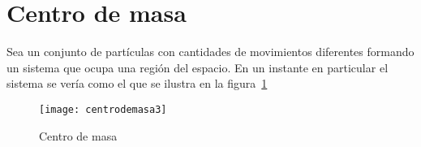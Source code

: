 \section{Centro de masa}


Sea un conjunto de partículas con cantidades de movimientos diferentes formando un sistema que ocupa una región del espacio. En un instante en particular el sistema se vería como el que se ilustra en la figura~\ref{fig:centrodemasa}
\begin{frame}
  \begin{figure}
  \centering
{\texttt{[image: centrodemasa3]}}
  \caption{Centro de masa}
  \label{fig:centrodemasa}
\end{figure}
\end{frame}

